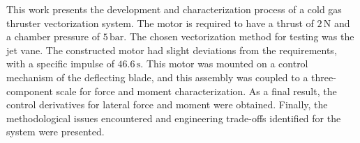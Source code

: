 This work presents the development and characterization process of a cold gas thruster vectorization system. The motor is required to have a thrust of \(2\, \mathrm{N}\) and a chamber pressure of \(5\, \mathrm{bar}\). The chosen vectorization method for testing was the jet vane. The constructed motor had slight deviations from the requirements, with a specific impulse of \(46.6\, \mathrm{s}\). This motor was mounted on a control mechanism of the deflecting blade, and this assembly was coupled to a three-component scale for force and moment characterization. As a final result, the control derivatives for lateral force and moment were obtained. Finally, the methodological issues encountered and engineering trade-offs identified for the system were presented.